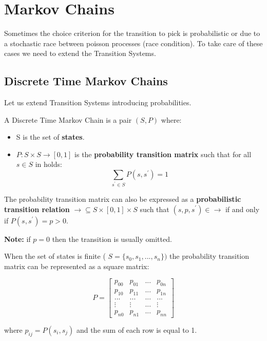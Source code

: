 \chapter{Markov Chains}
Sometimes the choice criterion for the transition to pick is probabilistic or due to a stochastic race between poisson processes (race condition). To take care of these cases we need to extend the Transition Systems.

\section{Discrete Time Markov Chains}
Let us extend Transition Systems introducing probabilities.\par
A Discrete Time Markov Chain is a pair $(S, P)$ where:
\begin{itemize}
    \item S is the set of \textbf{states}.
    \item $P: S \times S \rightarrow [0, 1]$ is the \textbf{probability transition matrix} such that for all $s \in S$ in holds:
    \begin{equation*}
        \sum_{s^{'} \in S} P(s, s^{'}) = 1        
    \end{equation*}
\end{itemize}

The probability transition matrix can also be expressed as a \textbf{probabilistic transition relation} $\rightarrow \subseteq S \times [0,1] \times S$ such that $(s, p, s^{'}) \in \rightarrow$ if and only if $P(s, s^{'}) = p > 0$. \par
\textbf{Note:} if $p = 0$ then the transition is usually omitted. \par

When the set of states is finite ( $S = \{s_{0}, s_{1}, ..., s_{n} \} )$ the probability transition matrix can be represented as a square matrix:

\[
P = \begin{bmatrix}
p_{00} & p_{01} & ... & p_{0n} \\
p_{10} & p_{11} & ... & p_{1n} \\
... & ... & ... & ... \\
\vdots & \vdots & ... & \vdots \\
p_{n0} & p_{n1} & ... & p_{nn}
\end{bmatrix}
\]

where $p_{ij} = P(s_{i}, s_{j})$ and the sum of each row is equal to 1. \par

